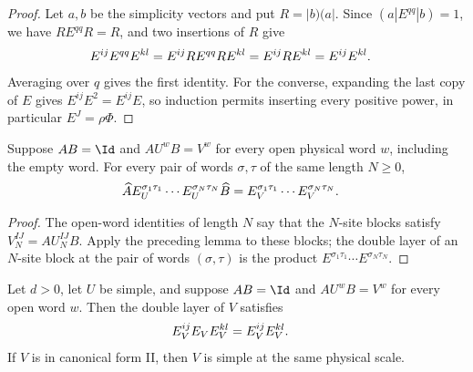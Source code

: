 \begin{proof}\leanok
    Let $a,b$ be the simplicity vectors and put $R=|b)(a|$. Since
    $(a|E^{qq}|b)=1$, we have $RE^{qq}R=R$, and two insertions of $R$ give
    \begin{align}
        E^{ij}E^{qq}E^{kl} & =E^{ij}RE^{qq}RE^{kl}=E^{ij}RE^{kl}=E^{ij}E^{kl}.
        \notag
    \end{align}
    Averaging over $q$ gives the first identity. For the converse, expanding
    the last copy of $E$ gives $E^{ij}E^2=E^{ij}E$, so induction permits
    inserting every positive power, in particular $E^J=\rho\Phi$.
\end{proof}

\begin{lemma}
    \label{lem:mpu_doubled_open_word_reduction}
    \leanok
    Suppose $AB=\Id$ and $AU^wB=V^w$ for every open physical word $w$,
    including the empty word. For every pair of words $\sigma,\tau$ of the
    same length $N\geq0$,
    \begin{align}
        \widehat A E_U^{\sigma_1\tau_1}\cdots
        E_U^{\sigma_N\tau_N}\widehat B
         & =E_V^{\sigma_1\tau_1}\cdots E_V^{\sigma_N\tau_N}.
        \notag
    \end{align}
\end{lemma}

\begin{proof}\leanok
    The open-word identities of length $N$ say that the $N$-site blocks
    satisfy $V_N^{IJ}=AU_N^{IJ}B$. Apply the preceding lemma to these
    blocks; the double layer of an $N$-site block at the pair of words
    $(\sigma,\tau)$ is the product $E^{\sigma_1\tau_1}\cdots E^{\sigma_N\tau_N}$.
\end{proof}

\begin{lemma}
    \label{lem:mpu_simple_canonical_reduction}
    \leanok
    Let $d>0$, let $U$ be simple, and suppose $AB=\Id$ and $AU^wB=V^w$
    for every open word $w$. Then the double layer of $V$ satisfies
    \begin{align}
        E_V^{ij}E_VE_V^{kl} & =E_V^{ij}E_V^{kl}.
        \notag
    \end{align}
    If $V$ is in canonical form II, then $V$ is simple at the same physical
    scale.
\end{lemma}

